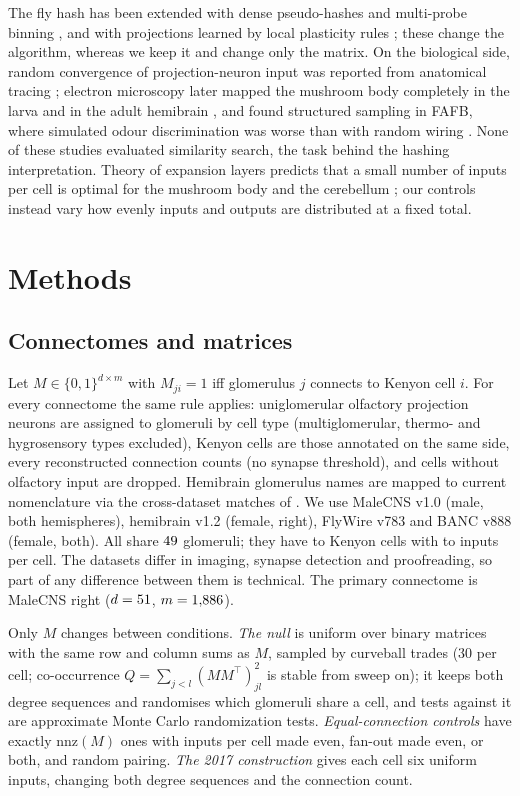 \documentclass[conference]{IEEEtran}
\begin{document}
The fly hash has been extended with dense pseudo-hashes and multi-probe
binning \cite{sharma2018}, and with projections learned by local plasticity
rules \cite{ryali2020,liang2021}; these change the algorithm, whereas we keep
it and change only the matrix. On the biological side, random convergence of
projection-neuron input was reported from anatomical tracing
\cite{caron2013}; electron microscopy later mapped the mushroom body
completely in the larva \cite{eichler2017} and in the adult hemibrain
\cite{li2020}, and found structured sampling in FAFB, where simulated odour
discrimination was worse than with random wiring \cite{zheng2022}. None of
these studies evaluated similarity search, the task behind the hashing
interpretation. Theory of expansion layers predicts that a small number of
inputs per cell is optimal for the mushroom body and the cerebellum
\cite{litwinkumar2017}; our controls instead vary how evenly inputs and
outputs are distributed at a fixed total.


\section{Methods}

\subsection{Connectomes and matrices}

Let $M\in\{0,1\}^{d\times m}$ with $M_{ji}=1$ iff glomerulus $j$ connects to
Kenyon cell $i$. For every connectome the same rule applies: uniglomerular
olfactory projection neurons are assigned to glomeruli by cell type
(multiglomerular, thermo- and hygrosensory types excluded), Kenyon cells are
those annotated on the same side, every reconstructed connection counts (no
synapse threshold), and cells without olfactory input are dropped. Hemibrain
glomerulus names are mapped to current nomenclature via the cross-dataset
matches of \cite{schlegel2024}. We use MaleCNS v1.0 (male, both hemispheres),
hemibrain v1.2 (female, right), FlyWire v783 and BANC v888 (female, both). All
share $49$ glomeruli; they have \AnimCellsMin{} to \AnimCellsMax{}
Kenyon cells with \AnimInMin{} to \AnimInMax{} inputs per cell. The datasets
differ in imaging, synapse detection and proofreading, so part of any
difference between them is technical. The primary connectome is MaleCNS right
($d=51$, $m=1{,}886$).

Only $M$ changes between conditions. \emph{The null} is uniform over binary
matrices with the same row and column sums as $M$, sampled by curveball trades
\cite{strona2014,carstens2015} (30 per cell; co-occurrence
$Q=\sum_{j<l}(MM^\top)_{jl}^2$ is stable from \PlateauSweeps{} sweep on); it
keeps both degree sequences and randomises which glomeruli share a cell, and
tests against it are approximate Monte Carlo randomization tests.
\emph{Equal-connection controls} have exactly $\mathrm{nnz}(M)$ ones with
inputs per cell made even, fan-out made even, or both, and random pairing.
\emph{The 2017 construction} gives each cell six uniform inputs, changing both
degree sequences and the connection count.
\end{document}
